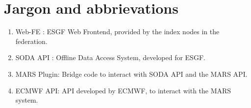 \documentclass[oneside,12pt]{memoir}
\def\phname{SODA API{ }}
\begin{document}
\chapter{Jargon and abbrievations}
\begin{enumerate}
\item Web-FE : ESGF Web Frontend, provided by the index nodes in the federation.
\item \phname: Offline Data Access System, developed for ESGF.
\item MARS Plugin: Bridge code to interact with SODA API and the MARS API.
\item ECMWF API: API developed by ECMWF, to interact with the MARS system. 
\end{enumerate}
\hypertarget{mymarker}{}
\printindex
\end{document}
